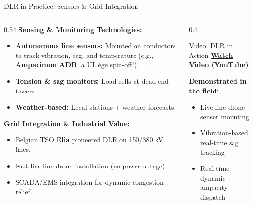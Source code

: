 \begin{frame}{DLR in Practice: Sensors \& Grid Integration}
\begin{columns}[c]
    \begin{column}{0.54\textwidth}
    \footnotesize
    \textbf{Sensing \& Monitoring Technologies:}
    \begin{itemize}\setlength{\itemsep}{2pt}
        \item \textbf{Autonomous line sensors:} Mounted on conductors to track vibration, sag, and temperature (e.g., \textbf{Ampacimon ADR}, a ULiège spin-off!).
        \item \textbf{Tension \& sag monitors:} Load cells at dead-end towers.
        \item \textbf{Weather-based:} Local stations + weather forecasts.
    \end{itemize}
    \vspace{0.4em}
    \textbf{Grid Integration \& Industrial Value:}
    \begin{itemize}\setlength{\itemsep}{2pt}
        \item Belgian TSO \textbf{Elia} pioneered DLR on 150/380 kV lines.
        \item Fast live-line drone installation (no power outage).
        \item SCADA/EMS integration for dynamic congestion relief.
    \end{itemize}
    \end{column}
    \begin{column}{0.4\textwidth}
        \begin{block}{Video: DLR in Action}
            \centering
            \vspace{0.3em}
            \href{https://www.youtube.com/embed/pzYvDuvM5JY}{\alert{\underline{\textbf{Watch Video (YouTube)}}}}
            \vspace{0.4em}
            
            \raggedright\scriptsize
            \textbf{Demonstrated in the field:}
            \begin{itemize}\setlength{\itemsep}{1pt}
                \item Live-line drone sensor mounting
                \item Vibration-based real-time sag tracking
                \item Real-time dynamic ampacity dispatch
            \end{itemize}
            \vspace{0.2em}
        \end{block}
    \end{column}
\end{columns}
\end{frame}

